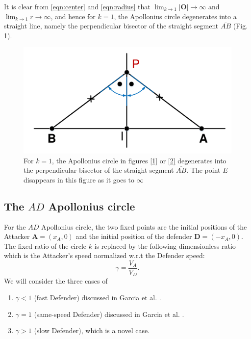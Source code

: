 It is clear from \eqref{eqn:center} and \eqref{eqn:radius} that $\lim_{k\to1}\lvert\boldsymbol{O}\rvert\to\infty$ and $\lim_{k\to1}r\to\infty$, and hence for $k=1$, the Apollonius circle degenerates into a straight line, namely the perpendicular bisector of the straight segment $\overline{AB}$ (Fig. \ref{3}).

\begin{figure}[htb]
	\centering
	\includegraphics[scale = 0.5]{fig/drawing3.pdf}
	\caption{For $k=1$, the Apollonius circle in figures \ref{1} or \ref{2} degenerates into the perpendicular bisector of the straight segment $\overline{AB}$. The point $E$ disappears in this figure as it goes to $\infty$  }
	\label{3}
\end{figure}


\subsection{The $AD$ Apollonius circle}
For the $AD$ Apollonius circle, the two fixed points are the initial positions of the Attacker $\boldsymbol{A}=(x_{A},0)$ and the initial position of the defender $\boldsymbol{D}=(-x_{A},0)$. The fixed ratio of the circle $k$ is replaced by the following dimensionless ratio which is the Attacker's speed normalized w.r.t the Defender speed: 
\begin{equation}
\gamma = \dfrac{V_{A}}{V_{D}}.
\end{equation}
We will consider the three cases of 

\begin{enumerate}
	\item $\gamma<1$ (fast Defender) discussed in Garcia et al. \cite{garcia2015active}.
	\item $\gamma =1$ (same-speed Defender) discussed in Garcia et al. \cite{pachter2014active, garcia2015escape}.
	\item $\gamma>1$ (slow Defender), which is a novel case. 
\end{enumerate}

